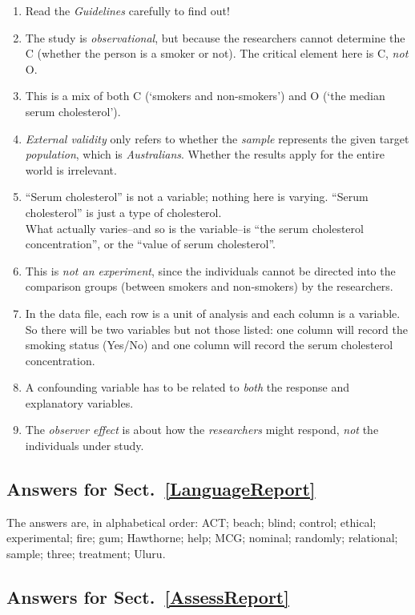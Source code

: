 \documentclass[
  11pt,
  a4paper,
  krantz2]{krantz}
\providecommand{\tightlist}{%
  \setlength{\itemsep}{0pt}\setlength{\parskip}{0pt}}
\begin{document}
\begin{footnotesize}
\begin{enumerate}
\def\labelenumi{\arabic{enumi}.}
\tightlist
\item
  Read the \emph{Guidelines} carefully to find out!
\item
  The study is \emph{observational}, but because the researchers cannot determine the C (whether the person is a smoker or not).
  The critical element here is C, \emph{not} O.
\item
  This is a mix of both C (`smokers and non-smokers') and O (`the median serum cholesterol').
\item
  \emph{External validity} only refers to whether the \emph{sample} represents the given target \emph{population}, which is \emph{Australians}.
  Whether the results apply for the entire world is irrelevant.
\item
  ``Serum cholesterol'' is not a variable; nothing here is varying. ``Serum cholesterol'' is just a type of cholesterol.\\
  What actually varies--and so is the variable--is ``the serum cholesterol concentration'', or the ``value of serum cholesterol''.
\item
  This is \emph{not an experiment}, since the individuals cannot be directed into the comparison groups (between smokers and non-smokers) by the researchers.
\item
  In the data file, each row is a unit of analysis and each column is a variable.
  So there will be two variables but not those listed: one column will record the smoking status (Yes/No) and one column will record the serum cholesterol concentration.
\item
  A confounding variable has to be related to \emph{both} the response and explanatory variables.
\item
  The \emph{observer effect} is about how the \emph{researchers} might respond, \emph{not} the individuals under study.
\end{enumerate}

\subsection*{Answers for Sect.~\ref{LanguageReport}}\label{answers-for-sect.-reflanguagereport}

The answers are, in alphabetical order:
ACT; beach; blind; control; ethical; experimental; fire; gum; Hawthorne; help; MCG; nominal; randomly; relational; sample; three; treatment; Uluru.

\subsection*{Answers for Sect.~\ref{AssessReport}}\label{answers-for-sect.-refassessreport}


\end{footnotesize}
\end{document}
